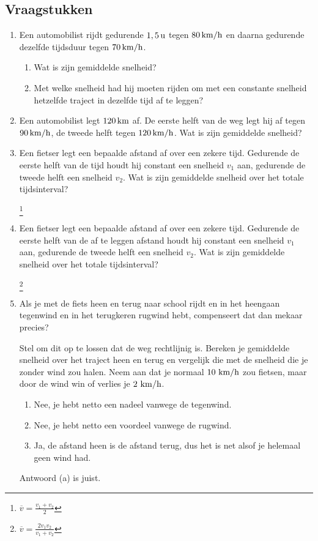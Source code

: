 
\subsection{Vraagstukken}

\begin{enumerate}




\item Een automobilist rijdt gedurende $1,5\rm\,u$ tegen $80\rm\,km/h$ en daarna gedurende dezelfde tijdsduur tegen
$70\rm\,km/h$.
\begin{enumerate}
\item Wat is zijn gemiddelde snelheid?
\item Met welke snelheid had hij moeten rijden om met een constante snelheid hetzelfde traject in dezelfde tijd af te leggen?
\end{enumerate}

\item Een automobilist legt $120\rm\,km$ af. De eerste helft van de weg legt hij af tegen $90\rm\,km/h$, de tweede helft tegen $120\rm\,km/h$. Wat is zijn gemiddelde snelheid?

\item Een fietser legt een bepaalde afstand af over een zekere tijd. Gedurende de eerste helft van de tijd houdt hij constant een snelheid $v_1$ aan, gedurende de tweede helft een snelheid $v_2$. Wat is zijn gemiddelde snelheid over het totale tijdsinterval?
\begin{oplossing}
\footnote{$\overline{v}=\frac{v_1+v_2}{2}$}
\end{oplossing}

\item Een fietser legt een bepaalde afstand af over een zekere tijd. Gedurende de eerste helft van de af te leggen afstand houdt hij constant een snelheid $v_1$ aan, gedurende de tweede helft een snelheid $v_2$. Wat is zijn gemiddelde snelheid over het totale tijdsinterval? 
\begin{oplossing}
\footnote{$\overline{v}=\frac{2v_1v_2}{v_1+v_2}$}
\end{oplossing}


\item Als je met de fiets heen en terug naar school rijdt en in het heengaan tegenwind en in het terugkeren rugwind hebt, compenseert dat dan mekaar precies?

Stel om dit op te lossen dat de weg rechtlijnig is. Bereken je gemiddelde snelheid over het traject heen en terug en vergelijk die met de snelheid die je zonder wind zou halen. Neem aan dat je normaal $10~\rm km/h$ zou fietsen, maar door de wind win of verlies je $2~\rm km/h$.
\begin{enumerate}
\item Nee, je hebt netto een nadeel vanwege de tegenwind.
\item Nee, je hebt netto een voordeel vanwege de rugwind.
\item Ja, de afstand heen is de afstand terug, dus het is net alsof je helemaal geen wind had.
\end{enumerate}
\begin{oplossing}
Antwoord (a) is juist.
\end{oplossing}


\end{enumerate}
